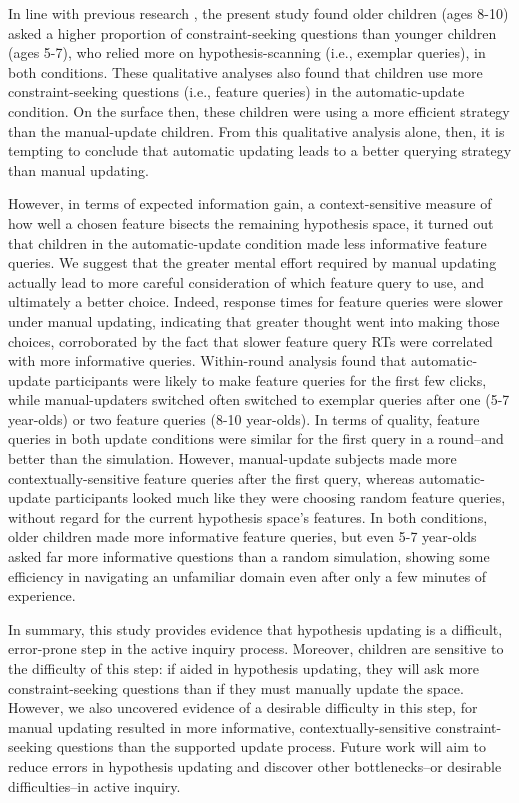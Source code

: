\documentclass[man,floatsintext]{apa6}
\begin{document}
In line with previous research \cite{Mosher:1966,Ruggeri:2014}, the present study found older children (ages 8-10) asked a higher proportion of constraint-seeking questions than younger children (ages 5-7), who relied more on hypothesis-scanning (i.e., exemplar queries), in both conditions. These qualitative analyses also found that children use more constraint-seeking questions (i.e., feature queries) in the automatic-update condition. On the surface then, these children were using a more efficient strategy than the manual-update children. %
From this qualitative analysis alone, then, it is tempting to conclude that automatic updating leads to a better querying strategy than manual updating.

However, in terms of expected information gain, a context-sensitive measure of how well a chosen feature bisects the remaining hypothesis space, it turned out that children in the 
automatic-update condition made less informative feature queries. We 
suggest that the greater mental effort required by manual updating actually lead 
to more careful consideration of which feature query to use, and ultimately a better choice. Indeed, response times for feature queries were slower under manual updating, indicating that greater thought went into making those choices, corroborated by the fact that slower feature query RTs were correlated with more informative queries. Within-round analysis found that automatic-update participants were likely to make feature queries for the first few clicks, while manual-updaters switched often switched to exemplar queries after one (5-7 year-olds) or two feature queries (8-10 year-olds). In terms of quality, feature queries in both update conditions were similar for the first query in a round--and better than the simulation. However, manual-update subjects made more contextually-sensitive feature queries after the first query, whereas automatic-update participants looked much like they were choosing random feature queries, without regard for the current hypothesis space's features. In both conditions, older children made more informative feature queries, but even 5-7 year-olds asked far more informative questions than a random simulation, showing some efficiency in navigating an unfamiliar domain even after only a few minutes of experience. 

In summary, this study provides evidence that hypothesis updating is a difficult, error-prone step in the active inquiry process. Moreover, children are sensitive to the difficulty of this step: if aided in hypothesis updating, they will ask more constraint-seeking questions than if they must manually update the space. However, we also uncovered evidence of a desirable difficulty in this step, for manual updating resulted in more informative, contextually-sensitive constraint-seeking questions than the supported update process. Future work will aim to reduce errors in hypothesis updating and discover other bottlenecks--or desirable difficulties--in active inquiry.
\end{document}
